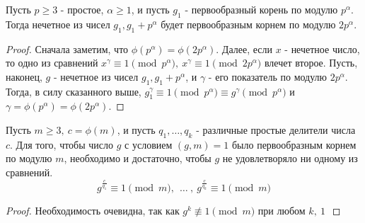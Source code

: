    \begin{theorem}\label{th11.3}
        Пусть $p\geq 3$ - простое, $\alpha\geq 1$, и пусть $g_1$ - первообразный корень по модулю $p^{\alpha}$. Тогда нечетное из чисел $g_1, g_1+p^{\alpha}$ будет первообразным корнем по модулю $2p^{\alpha}$.
    \end{theorem} 
    \begin{proof}
        Сначала заметим, что $\phi(p^{\alpha})=\phi(2p^{\alpha})$. Далее, если $x$ - нечетное число, то одно из сравнений $x^{\gamma}\equiv 1\pmod{p^{\alpha}},\ x^{\gamma}\equiv 1\pmod{2p^{\alpha}}$ влечет второе. Пусть, наконец, $g$ - нечетное из чисел $g_1, g_1+p^{\alpha}$, и $\gamma$ - его показатель по модулю $2p^{\alpha}$. Тогда, в силу сказанного выше, $g_1^{\gamma}\equiv 1\pmod{p^{\alpha}}\equiv g^{\gamma}\pmod{p^{\alpha}}$ и $\gamma=\phi(p^{\alpha})=\phi(2p^{\alpha})$.
    \end{proof}
    \begin{theorem}\label{th11.4}
        Пусть $m\geq 3,\ c=\phi(m)$, и пусть $q_1,\dots, q_k$ - различные простые делители числа $c$. Для того, чтобы число $g$ с условием $(g, m)=1$ было первообразным корнем по модулю $m$, необходимо и достаточно, чтобы $g$ не удовлетворяло ни одному из сравнений.
        \begin{equation} \label{eq6}
            g^{\frac{c}{q_1}}\equiv 1\pmod{m},\ \ \dots\ ,\ g^{\frac{c}{q_k}}\equiv 1\pmod{m}
        \end{equation}
    \end{theorem} 
    \begin{proof}
        Необходимость очевидна, так как $g^k\not\equiv 1\pmod{m}$ при любом $k,\ 1\ $
    \end{proof} 